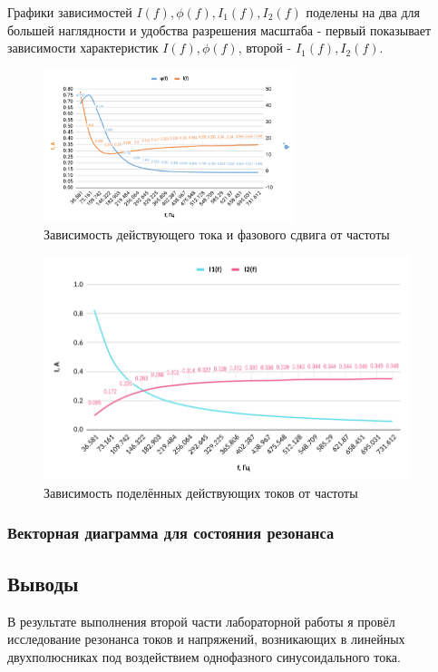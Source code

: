 Графики зависимостей $I(f), \phi(f), I_1 (f), I_2 (f)$ поделены на два для большей наглядности и удобства разрешения масштаба - первый показывает зависимости характеристик $I(f), \phi(f)$, второй - $I_1 (f), I_2 (f)$.

\begin{figure}[H]
	\centering
	\includegraphics[width=0.65\textwidth]{./data/graph_part2_3.png}
	\caption{Зависимость действующего тока и фазового сдвига от частоты}
\end{figure}

\begin{figure}[H]
	\centering
	\includegraphics[width=0.95\textwidth]{./data/graph_part2_4.png}
	\caption{Зависимость поделённых действующих токов от частоты}
\end{figure}


\subsubsection{Векторная диаграмма для состояния резонанса}


\subsection{Выводы}
В результате выполнения второй части лабораторной работы я провёл исследование резонанса токов и напряжений, возникающих в линейных двухполюсниках под воздействием однофазного синусоидального тока.

